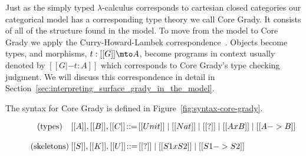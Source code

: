 Just as the simply typed $\lambda$-calculus corresponds to cartesian
closed categories our categorical model has a corresponding type
theory we call Core Grady.  It consists of all of the structure found
in the model.  To move from the model to Core Grady we apply the
Curry-Howard-Lambek
correspondence~\cite{Wadler:2015:PT:2847579.2699407,Lambek:1980}.
Objects become types, and morphisms, $t : [[G]] \mto A$, become
programs in context usually denoted by $[[G |- t : A]]$ which
corresponds to Core Grady's type checking judgment.  We will discuss
this correspondence in detail in
Section~\ref{sec:interpreting_surface_grady_in_the_model}.

The syntax for Core Grady is defined in
Figure~\ref{fig:syntax-core-grady}.
\begin{figure}
  \scriptsize
  \begin{mdframed}
    \[
      \setlength{\arraycolsep}{0.6pt}
      \begin{array}{cl}      
        \begin{array}{l}
          \text{(types)}\\
        \end{array}     &
        \begin{array}{lcl}
          [[A]],[[B]],[[C]] & ::= & [[Unit]] \mid [[Nat]] \mid [[?]] \mid [[A x B]] \mid [[A -> B]] \\
        \end{array}\\\\
        
        \begin{array}{lll}
          \text{(skeletons)}\\
        \end{array} &
        \begin{array}{lcl}
          [[S]],[[K]],[[U]] & ::= & [[?]] \mid [[S1 x S2]] \mid [[S1 -> S2]]\\
        \end{array}\\\\
        

\end{array}\]
\end{mdframed}
\end{figure}
